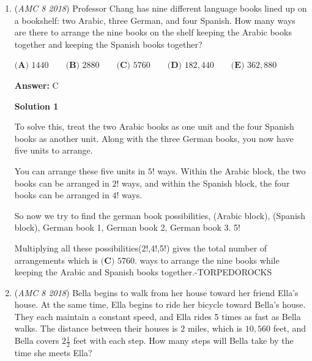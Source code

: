\begin{enumerate}
 



\textbf{Solution 5}

Since the smaller circles are equivalent, the area of each of them is $\frac{1}{2}$ square unit. Since the diameter of each of the two smaller circles is a radius of the larger circle, their areas must be in a ratio of $1:2$. This tells us that the area of the larger circle is double the area of the smaller circle, giving us $\frac{1}{2} \cdot 2 = \boxed{\textbf{(D) } 1}$.

 


 


	\item (\textit{AMC 8 2018}) Professor Chang has nine different language books lined up on a bookshelf: two Arabic, three German, and four Spanish. How many ways are there to arrange the nine books on the shelf keeping the Arabic books together and keeping the Spanish books together?


 $\textbf{(A) }1440\qquad\textbf{(B) }2880\qquad\textbf{(C) }5760\qquad\textbf{(D) }182,440\qquad \textbf{(E) }362,880$

 \textbf{Answer: }C



\textbf{Solution 1}

To solve this, treat the two Arabic books as one unit and the four Spanish books as another unit. Along with the three German books, you now have five units to arrange.

 You can arrange these five units in $5!$ ways. Within the Arabic block, the two books can be arranged in $2!$ ways, and within the Spanish block, the four books can be arranged in $4!$ ways.

 
So now we try to find the german book possibilities, (Arabic block), (Spanish block), German book 1, German book 2, German book 3. 5!

 
Multiplying all these possibilities(2!,4!,5!) gives the total number of arrangements which is $\boxed{\textbf{(C) }5760}.$ ways to arrange the nine books while keeping the Arabic and Spanish books together.-TORPEDOROCKS

 


	\item (\textit{AMC 8 2018}) Bella begins to walk from her house toward her friend Ella's house. At the same time, Ella begins to ride her bicycle toward Bella's house. They each maintain a constant speed, and Ella rides 5 times as fast as Bella walks. The distance between their houses is $2$ miles, which is $10,560$ feet, and Bella covers $2 \frac{1}{2}$ feet with each step. How many steps will Bella take by the time she meets Ella?



\end{enumerate}
